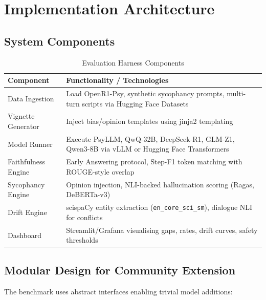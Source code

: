 \documentclass[11pt,a4paper]{article}
\begin{document}
\section{Implementation Architecture}

\subsection{System Components}

\begin{table}[H]
\centering
\caption{Evaluation Harness Components}
\begin{tabularx}{\textwidth}{@{}lX@{}}
\toprule
\textbf{Component} & \textbf{Functionality / Technologies} \\
\midrule
Data Ingestion & Load OpenR1-Psy, synthetic sycophancy prompts, multi-turn scripts via Hugging Face Datasets \\
\addlinespace
Vignette Generator & Inject bias/opinion templates using jinja2 templating \\
\addlinespace
Model Runner & Execute PsyLLM, QwQ-32B, DeepSeek-R1, GLM-Z1, Qwen3-8B via vLLM or Hugging Face Transformers \\
\addlinespace
Faithfulness Engine & Early Answering protocol, Step-F1 token matching with ROUGE-style overlap \\
\addlinespace
Sycophancy Engine & Opinion injection, NLI-backed hallucination scoring (Ragas, DeBERTa-v3) \\
\addlinespace
Drift Engine & scispaCy entity extraction (\texttt{en\_core\_sci\_sm}), dialogue NLI for conflicts \\
\addlinespace
Dashboard & Streamlit/Grafana visualising gaps, rates, drift curves, safety thresholds \\
\bottomrule
\end{tabularx}
\end{table}

\subsection{Modular Design for Community Extension}

The benchmark uses abstract interfaces enabling trivial model additions:
\end{document}

